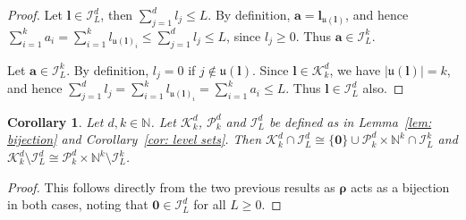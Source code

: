 \documentclass[pdflatex,sn-mathphys-num]{sn-jnl}%
\theoremstyle{thmstyleone}%
\newtheorem{corollary}{Corollary}
\theoremstyle{thmstyletwo}%
\theoremstyle{thmstylethree}%
\begin{document}
\begin{appendices}
\begin{proof}
Let \(\boldsymbol{l}\in \mathcal{I}^d_L\), then \(\sum_{j=1}^dl_j\leq L\).
By definition, \(\mathbf{a}=\boldsymbol{l}_{\mathfrak{u}(\boldsymbol{l})}\), and hence \(\sum_{i=1}^ka_i=\sum_{i=1}^kl_{\mathfrak{u}(\boldsymbol{l})_i}\leq\sum_{j=1}^dl_j\leq L\), since \(l_j\geq0\). Thus \(\mathbf{a}\in\mathcal{I}^k_L\).

Let \(\mathbf{a}\in\mathcal{I}^k_L\). By definition, \(l_j=0\) if \(j\notin\mathfrak{u}(\boldsymbol{l})\). Since \(\boldsymbol{l}\in\mathcal{K}^d_k\), we have \(|\mathfrak{u}(\boldsymbol{l})|=k\), and hence \(\sum_{j=1}^dl_j=\sum_{i=1}^kl_{\mathfrak{u}(\boldsymbol{l})_i}=\sum_{i=1}^ka_i\leq L\). Thus \(\boldsymbol{l}\in\mathcal{I}^d_L\) also.
\end{proof}

\begin{corollary}\label{cor: isomporphic}
    Let \(d,k\in\mathbb{N}\). Let \(\mathcal{K}_k^d\), \(\mathcal{P}_k^d\) and \(\mathcal{I}_L^d\) be defined as in Lemma~\ref{lem: bijection} and Corollary~\ref{cor: level sets}. Then \(\mathcal{K}_k^d\cap\mathcal{I}_L^d\cong\{\mathbf{0}\}\cup\mathcal{P}^d_k\times\mathbb{N}^k\cap\mathcal{I}_L^k\) and \(\mathcal{K}_k^d\setminus\mathcal{I}_L^d\cong\mathcal{P}^d_k\times\mathbb{N}^k\setminus\mathcal{I}_L^k\).
\end{corollary}

\begin{proof}
    This follows directly from the two previous results as \(\boldsymbol{\rho}\) acts as a bijection in both cases, noting that \(\mathbf{0}\in\mathcal{I}^d_{L}\) for all \(L\geq0\).
\end{proof}




\end{appendices}
\end{document}
